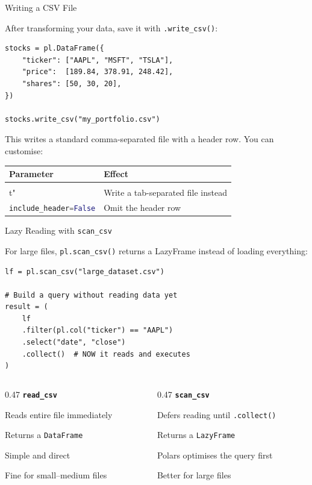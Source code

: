 \documentclass[9pt,aspectratio=169]{beamer}
\newcommand{\py}[1]{\lstinline[language=Python]{#1}}
\begin{document}
\begin{frame}[fragile]{Writing a CSV File}

After transforming your data, save it with \py{.write_csv()}:

\begin{lstlisting}
stocks = pl.DataFrame({
    "ticker": ["AAPL", "MSFT", "TSLA"],
    "price":  [189.84, 378.91, 248.42],
    "shares": [50, 30, 20],
})

stocks.write_csv("my_portfolio.csv")
\end{lstlisting}

\medskip

This writes a standard comma-separated file with a header row. You can customise:

\medskip

\begin{tabular}{@{}lp{6cm}@{}}
\toprule
\textbf{Parameter} & \textbf{Effect} \\
\midrule
\py{separator="\\t"} & Write a tab-separated file instead \\[0.3em]
\py{include_header=False} & Omit the header row \\
\bottomrule
\end{tabular}

\end{frame}


\begin{frame}[fragile]{Lazy Reading with \texttt{scan\_csv}}

For large files, \py{pl.scan_csv()} returns a \alert{LazyFrame} instead of loading everything:

\begin{lstlisting}
lf = pl.scan_csv("large_dataset.csv")

# Build a query without reading data yet
result = (
    lf
    .filter(pl.col("ticker") == "AAPL")
    .select("date", "close")
    .collect()  # NOW it reads and executes
)
\end{lstlisting}

\medskip

\begin{columns}[T]
\begin{column}{0.47\textwidth}
\textbf{\texttt{read\_csv}}
\bi
    \item Reads entire file immediately
    \item Returns a \texttt{DataFrame}
    \item Simple and direct
    \item Fine for small--medium files
\ei
\end{column}
\begin{column}{0.47\textwidth}
\textbf{\texttt{scan\_csv}}
\bi
    \item Defers reading until \py{.collect()}
    \item Returns a \texttt{LazyFrame}
    \item Polars optimises the query first
    \item Better for large files
\ei
\end{column}
\end{columns}

\end{frame}
\end{document}
